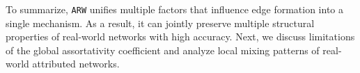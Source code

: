 


To summarize, \texttt{ARW} unifies multiple factors that influence edge formation
into a single mechanism. As a result, it can jointly preserve multiple structural
properties of real-world networks with high accuracy. Next, we discuss limitations
of the global assortativity coefficient and analyze local mixing patterns of
real-world attributed networks.

